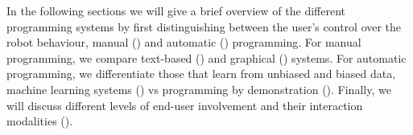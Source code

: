 In the following sections we will give a brief overview of the different programming systems by first distinguishing between the user's control over the robot behaviour, \ie manual () and automatic () programming.
For manual programming, we compare text-based () and graphical () systems.
For automatic programming, we differentiate those that learn from unbiased and biased data, \ie machine learning systems () vs programming by demonstration ().
Finally, we will discuss different levels of end-user involvement and their interaction modalities ().



